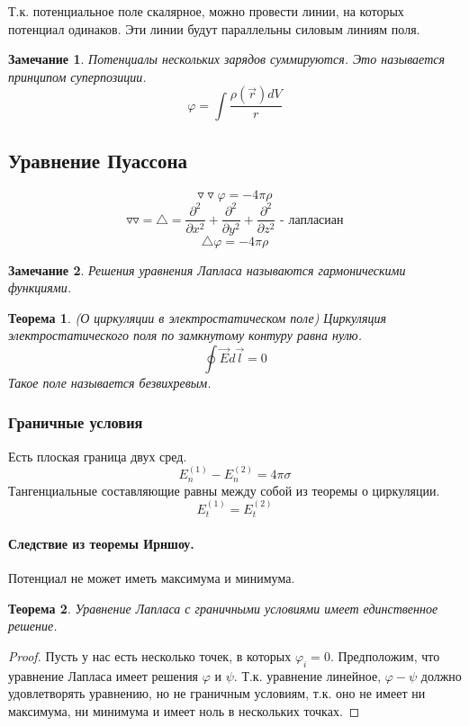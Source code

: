 \documentclass{article}
\newtheorem{teo}{Теорема}
\newtheorem*{ntc}{Замечание}
\begin{document}
    Т.к. потенциальное поле скалярное, можно провести линии, на которых потенциал одинаков. Эти линии будут параллельны силовым линиям поля.
    
    \begin{ntc}
    Потенциалы нескольких зарядов суммируются. Это называется принципом суперпозиции.
    $$ \varphi = \int \frac{\rho(\overrightarrow{r})dV}{r} $$
    \end{ntc}
    
    \subsection*{Уравнение Пуассона}
    $$ \triangledown \triangledown \varphi = -4\pi\rho $$
    $$ \triangledown \triangledown = \triangle = \frac{\partial^2}{\partial x^2} + \frac{\partial^2}{\partial y^2} + \frac{\partial^2}{\partial z^2} \text{ - лапласиан} $$
    $$ \boxed{\triangle \varphi = - 4\pi\rho} $$
    
    \begin{ntc}
    Решения уравнения Лапласа называются гармоническими функциями.
    \end{ntc}
    
    \begin{teo} {(О циркуляции в электростатическом поле)}
    Циркуляция электростатического поля по замкнутому контуру равна нулю.
    $$ \oint \overrightarrow{E}d\overrightarrow{l} = 0 $$
    Такое поле называется безвихревым.
    \end{teo}
    
    \subsubsection*{Граничные условия}
    Есть плоская граница двух сред. 
    $$ E_n^{(1)} - E_n^{(2)} = 4\pi\sigma $$
    Тангенциальные составляющие равны между собой из теоремы о циркуляции.
    $$ E_t^{(1)} = E_t^{(2)} $$
    
    \paragraph{Следствие из теоремы Ирншоу.} Потенциал не может иметь максимума и минимума.
    \begin{teo}
    Уравнение Лапласа с граничными условиями имеет единственное решение.
    \end{teo}  
    \begin{proof}
    Пусть у нас есть несколько точек, в которых $\varphi_i = 0$.
    Предположим, что уравнение Лапласа имеет решения $\varphi$ и $\psi$. Т.к. уравнение линейное, $\varphi - \psi$ должно удовлетворять уравнению, но не граничным условиям, т.к. оно не имеет ни максимума, ни минимума и имеет ноль в нескольких точках.
    \end{proof}
    
\end{document}

